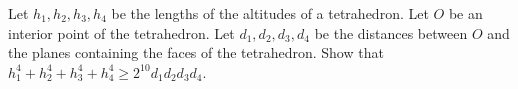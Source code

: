 Let $h_1, h_2, h_3, h_4$ be the lengths of the altitudes of a tetrahedron.
Let $O$ be an interior point of the tetrahedron.
Let $d_1, d_2, d_3, d_4$ be the distances between $O$
and the planes containing the faces of the tetrahedron.
Show that
$h_1^4 + h_2^4 + h_3^4 + h_4^4
 \geq
 2^{10} d_1 d_2 d_3 d_4$.
